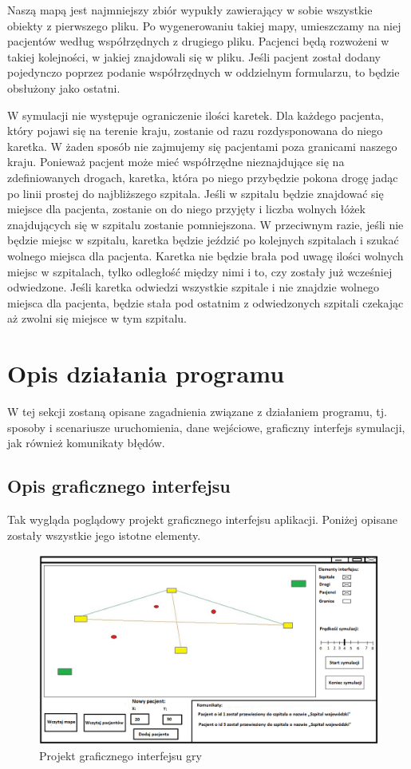 \documentclass[12pt,a4paper]{article}
\begin{document}
Naszą mapą jest najmniejszy zbiór wypukły zawierający w sobie wszystkie obiekty z pierwszego pliku. Po wygenerowaniu takiej mapy, umieszczamy na niej pacjentów według współrzędnych z drugiego pliku. Pacjenci będą rozwożeni w takiej kolejności, w jakiej znajdowali się w pliku. Jeśli pacjent został dodany pojedynczo poprzez podanie współrzędnych w oddzielnym formularzu, to będzie obsłużony jako ostatni.
    
W symulacji nie występuje ograniczenie ilości karetek. Dla każdego pacjenta, który pojawi się na terenie kraju, zostanie od razu rozdysponowana do niego karetka. W żaden  sposób nie zajmujemy się pacjentami poza granicami naszego kraju. Ponieważ pacjent może mieć współrzędne nieznajdujące się na zdefiniowanych drogach, karetka, która po niego przybędzie pokona drogę jadąc po linii prostej do najbliższego szpitala. Jeśli w szpitalu będzie znajdować się miejsce dla pacjenta, zostanie on do niego przyjęty i liczba wolnych łóżek znajdujących się w szpitalu zostanie pomniejszona. W przeciwnym razie, jeśli nie będzie miejsc w szpitalu, karetka będzie jeździć po kolejnych szpitalach i szukać wolnego miejsca dla pacjenta. Karetka nie będzie brała pod uwagę ilości wolnych miejsc w szpitalach, tylko odległość między nimi i to, czy zostały już wcześniej odwiedzone. Jeśli karetka odwiedzi wszystkie szpitale i nie znajdzie wolnego miejsca dla pacjenta, będzie stała pod ostatnim z odwiedzonych szpitali czekając aż zwolni się miejsce w tym szpitalu.

\section{Opis działania programu}
W tej sekcji zostaną opisane zagadnienia związane z działaniem programu, tj. sposoby i scenariusze uruchomienia, dane wejściowe, graficzny interfejs symulacji, jak również komunikaty błędów. 

\subsection{Opis graficznego interfejsu}
Tak wygląda poglądowy projekt graficznego interfejsu aplikacji. Poniżej opisane zostały wszystkie jego istotne elementy.

\begin{figure}[h!]
\centering
\includegraphics[width=1.0\textwidth]{GUI}
\caption{Projekt graficznego interfejsu gry} 
\label{fig:GUI}
\end{figure}
\end{document}
